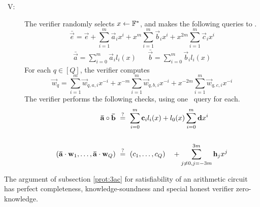 \begin{description}
\item[\ V:] The verifier randomly selects $x\gets \mathbb{F}^*$, and makes the following queries to \ILC.
\[
\bar{\vec{e}} = \vec{e} + \sum_{i=1}^m \vec{a}_{i} x^i + x^m \sum_{i=1}^m \vec{b}_{i} x^i + x^{2m} \sum_{i=1}^m \vec{c}_{i} x^i
\]
\begin{align*}
\bar{\vec{a}} = \sum_{i=0}^m \vec{a}_{i} l_i(x) && \bar{\vec{b}} = \sum_{i=0}^m \vec{b}_{i} l_i(x)
\end{align*}
For each $q \in [Q]$, the verifier computes
\[
\vec{w}_q = \sum_{i=1}^m \vec{w}_{q,a,i} x^{-i} + x^{-m} \sum_{i=1}^m \vec{w}_{q,b,i} x^{-i} + x^{-2m} \sum_{i=1}^m \vec{w}_{q,c,i} x^{-i}
\]
The verifier performs the following checks, using one \ILCcheck\ query for each.
\begin{align*}
\mathbf{\bar{a}} \circ \mathbf{\bar{b}} ~&\overset{?}{=}~ \sum_{i=0}^m \mathbf{c}_{i} l_i(x) + l_0(x) \sum_{i=0}^m \mathbf{d} x^i \\ \\
\left(\mathbf{\bar{a}}\cdot \mathbf{w}_1,\ldots,\mathbf{\bar{a}}\cdot \mathbf{w}_Q \right) ~&\overset{?}{=}~ (c_1,\ldots,c_Q) \quad + \sum_{j\neq 0,j=-3m}^{3m} \mathbf{h}_j {x^j}
\end{align*}
\end{description}

\begin{thm}
The argument of subsection \ref{prot:3ac} for satisfiability of an arithmetic circuit has perfect completeness, knowledge-soundness and special honest verifier zero-knowledge.
\end{thm}

